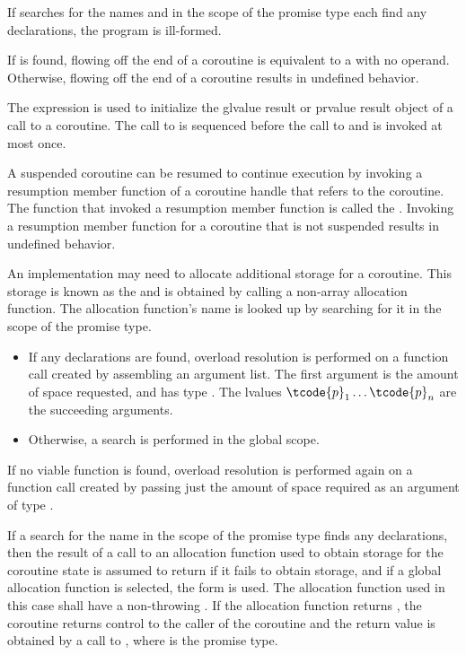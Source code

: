 \pnum
If searches for the names  and 
in the scope of the promise type each find any declarations,
the program is ill-formed.
\begin{note}
If  is found, flowing off
the end of a coroutine is equivalent to a  with no operand.
Otherwise, flowing off the end of a coroutine
results in undefined behavior.
\end{note}

\pnum
The expression  is used
to initialize
the glvalue result or prvalue result object of a call to a coroutine.
The call to 
is sequenced before
the call to 
and is invoked at most once.

\pnum
A suspended coroutine can be resumed to continue execution by invoking
a resumption member function
of a coroutine handle
that refers to the coroutine.
The function that invoked a resumption member function is
called the .
Invoking a resumption member function for a coroutine
that is not suspended results in undefined behavior.

\pnum
An implementation may need to allocate additional storage for a coroutine.
This storage is known as the  and is obtained by calling
a non-array allocation function.
The allocation function's name is looked up by searching for it in the scope of the promise type.
\begin{itemize}
\item
If any declarations are found,
overload resolution is performed on a function call created by assembling an
argument list. The first argument is the amount of space requested, and has
type .
The lvalues $\tcode{p}_1 \dotsc \tcode{p}_n$ are the succeeding arguments.
\item
Otherwise, a search is performed in the global scope.
\end{itemize}
If no viable function is found,
overload resolution is performed again
on a function call created by passing just
the amount of space required as an argument of type .

\pnum
If a search for the name 
in the scope of the promise type finds
any declarations, then the result
of a call to an allocation function used to obtain storage for the coroutine
state is assumed to return  if it fails to obtain storage,
and if a global allocation function is selected,
the  form is used.
The allocation function used in this case shall have a non-throwing
.
If the allocation function returns , the coroutine returns
control to the caller of the coroutine and the return value is obtained by a
call to , where 
is the promise type.


